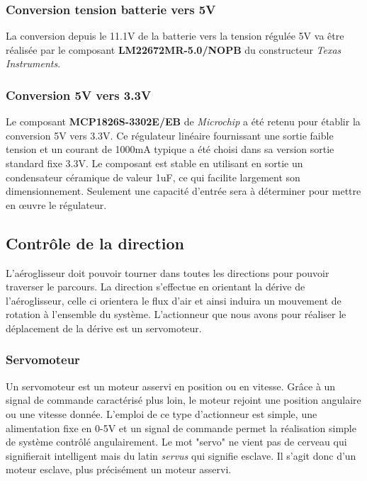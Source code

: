 \documentclass[a4paper,12pt]{report}
\begin{document}
			
			\subsubsection{Conversion tension batterie vers 5V}
				
			La conversion depuis le 11.1V de la batterie vers la tension régulée 5V va être réalisée par le composant \textbf{LM22672MR-5.0/NOPB} du constructeur \textit{Texas Instruments}.
			
			\subsubsection{Conversion 5V vers 3.3V}
			
			Le composant \textbf{MCP1826S-3302E/EB} de \textit{Microchip} a été retenu pour établir la conversion 5V vers 3.3V. Ce régulateur linéaire fournissant une sortie faible tension et un courant de 1000mA typique a été choisi dans sa version sortie standard fixe 3.3V. Le composant est stable en utilisant en sortie un condensateur céramique de valeur 1uF, ce qui facilite largement son dimensionnement. Seulement une capacité d'entrée sera à déterminer pour mettre en œuvre le régulateur.
	
		\subsection{Contrôle de la direction}
			L'aéroglisseur doit pouvoir tourner dans toutes les directions pour pouvoir traverser le parcours. La direction s'effectue en orientant la dérive de l'aéroglisseur, celle ci orientera le flux d'air et ainsi induira un mouvement de rotation à l'ensemble du système. L'actionneur que nous avons pour réaliser le déplacement de la dérive est un servomoteur.
			\subsubsection{Servomoteur}
			Un servomoteur est un moteur asservi en position ou en vitesse. Grâce à un signal de commande caractérisé plus loin, le moteur rejoint une position angulaire ou une vitesse donnée. L'emploi de ce type d'actionneur est simple, une alimentation fixe en 0-5V et un signal de commande permet la réalisation simple de système contrôlé angulairement. Le mot "servo" ne vient pas de cerveau qui signifierait intelligent mais du latin \textit{servus} qui signifie esclave. Il s'agit donc d'un moteur esclave, plus précisément un moteur asservi.
			
\end{document}
